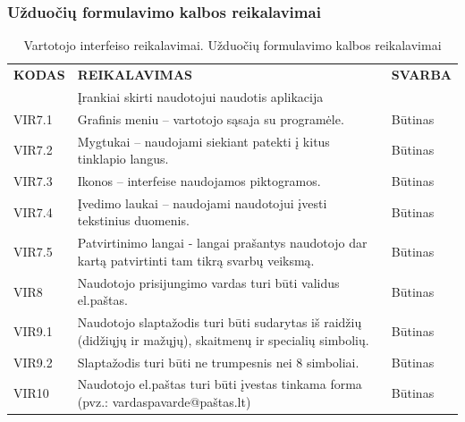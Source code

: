 \documentclass{VUMIFPSkursinis}
\begin{document}
\subsubsection{Užduočių formulavimo kalbos reikalavimai}
\begin{table}[H]
\caption{Vartotojo interfeiso reikalavimai. Užduočių formulavimo kalbos reikalavimai}
\centering
\normalsize
\begin{tabular}{|p{2cm}|p{10cm}|p{3cm}|}
\hline
\rowcolor{gray!30}
\multicolumn{3}{|l|}{\textbf{3.	Užduočių formulavimo kalbos reikalavimai}} \\ \hline
\textbf{KODAS}& \multicolumn{1}{m{10cm}|}{\textbf{REIKALAVIMAS}} & \textbf{SVARBA} \\ \hline
 & \multicolumn{2}{|l|}{Įrankiai skirti naudotojui naudotis aplikacija} \\ \hline
VIR7.1 & \multicolumn{1}{m{10cm}|}{Grafinis meniu – vartotojo sąsaja su programėle.} & Būtinas \\ \hline
VIR7.2 & \multicolumn{1}{m{10cm}|}{Mygtukai – naudojami siekiant patekti į kitus tinklapio langus.} & Būtinas \\ \hline
VIR7.3 & \multicolumn{1}{m{10cm}|}{Ikonos – interfeise naudojamos piktogramos.} & Būtinas \\ \hline
VIR7.4 & \multicolumn{1}{m{10cm}|}{Įvedimo laukai – naudojami naudotojui įvesti tekstinius duomenis.} & Būtinas \\ \hline
VIR7.5 & \multicolumn{1}{m{10cm}|}{Patvirtinimo langai - langai prašantys naudotojo dar kartą patvirtinti tam tikrą svarbų veiksmą.} & Būtinas \\ \hline
VIR8 & \multicolumn{1}{m{10cm}|}{Naudotojo prisijungimo vardas turi būti validus el.paštas.} & Būtinas \\ \hline
VIR9.1 & \multicolumn{1}{m{10cm}|}{Naudotojo slaptažodis turi būti sudarytas iš raidžių (didžiųjų ir mažųjų), skaitmenų ir specialių simbolių.} & Būtinas \\ \hline
VIR9.2 & \multicolumn{1}{m{10cm}|}{Slaptažodis turi būti ne trumpesnis nei 8 simboliai.} & Būtinas \\ \hline
VIR10 & \multicolumn{1}{m{10cm}|}{Naudotojo el.paštas turi būti įvestas tinkama forma (pvz.: vardaspavarde@paštas.lt)} & Būtinas \\ \hline
\end{tabular}
\end{table}
\end{document}
